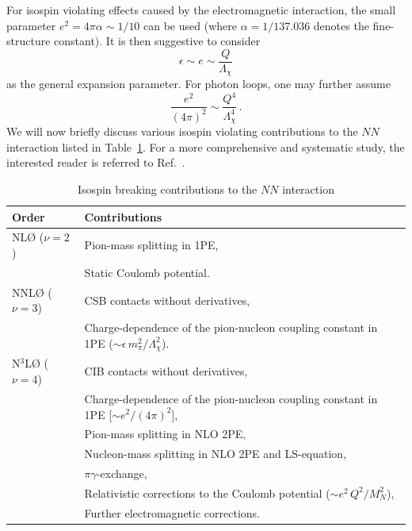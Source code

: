 \documentclass[sort&compress,preprint,3p]{elsarticle}
\begin{document}
For isospin violating effects caused by the electromagnetic interaction,
the small parameter $e^2=4\pi\alpha \sim 1/10$ can be used
(where $\alpha=1/137.036$ denotes the fine-structure constant). 
It is then suggestive to consider
\begin{equation}
\epsilon \sim e \sim \frac{Q}{\Lambda_\chi}
\label{eq_IBpar1}
\end{equation}
as the general expansion parameter.
For photon loops, one may further assume
\begin{equation}
\frac{e^2}{(4\pi)^2} \sim \frac{Q^4}{\Lambda_\chi^4}
\,.
\label{eq_IBpar2}
\end{equation}
We will now briefly discuss various isospin violating contributions to the $NN$ interaction
listed in Table~\ref{tab_IBcontr}. For a more comprehensive and systematic study,
the interested reader is referred to Ref.~\cite{EM05}.

\begin{table}[t]
\caption{Isospin breaking contributions to the $NN$ interaction}
\label{tab_IBcontr}
\smallskip
\begin{tabular*}{\textwidth}{@{\extracolsep{\fill}}ll}
\hline 
\hline 
\noalign{\smallskip}
 {\bf Order} & {\bf Contributions} \\
\hline 
\hline 
\noalign{\smallskip}
NL\O \hspace*{.1cm} ($\nu=2$) 
                          & Pion-mass splitting in 1PE, \\
                          & Static Coulomb potential. \\  
\hline 
NNL\O \hspace*{.1cm} ($\nu=3$) 
                          & CSB contacts without derivatives, \\
                          & Charge-dependence of the pion-nucleon coupling constant in 1PE
                           ($\sim \epsilon \, m_\pi^2/\Lambda_\chi^2$). \\
\hline 
\noalign{\smallskip}
N$^3$L\O \hspace*{.1cm} ($\nu=4$)
                          & CIB contacts without derivatives, \\
                          & Charge-dependence of the pion-nucleon coupling constant in 1PE
                           [$\sim e^2/(4\pi)^2$], \\
                          & Pion-mass splitting in NLO 2PE, \\
                          & Nucleon-mass splitting in NLO 2PE and LS-equation, \\
                          & $\pi\gamma$-exchange, \\
                          & Relativistic corrections to the Coulomb potential ($\sim e^2 \, Q^2/M^2_N$), \\
                          & Further electromagnetic corrections.\\
\hline 
\hline 
\end{tabular*}
\end{table}
\end{document}
